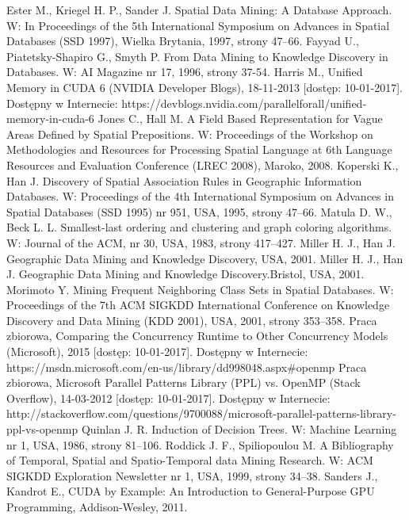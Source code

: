 \documentclass[12pt]{article}
\begin{document}
\begin{thebibliography}{}
Ester M., Kriegel H. P., Sander J. Spatial Data Mining: A Database Approach. W: In Proceedings of the 5th International Symposium on Advances in Spatial Databases (SSD 1997), Wielka Brytania, 1997, strony 47–66.
Fayyad U., Piatetsky-Shapiro G., Smyth P. From Data Mining to Knowledge Discovery in Databases. W: AI Magazine nr 17, 1996, strony 37-54.
Harris M., Unified Memory in CUDA 6 (NVIDIA Developer Blogs), 18-11-2013 [dostęp: 10-01-2017]. Dostępny w Internecie: https://devblogs.nvidia.com/parallelforall/unified-memory-in-cuda-6
Jones C., Hall M. A Field Based Representation for Vague Areas Defined by Spatial Prepositions. W: Proceedings of the Workshop on Methodologies and Resources for Processing Spatial Language at 6th Language Resources and Evaluation Conference (LREC 2008), Maroko, 2008.
Koperski K., Han J. Discovery of Spatial Association Rules in Geographic Information Databases. W: Proceedings of the 4th International Symposium on Advances in Spatial Databases (SSD 1995) nr 951, USA, 1995, strony 47–66.
Matula D. W., Beck L. L. Smallest-last ordering and clustering and graph coloring algorithms. W: Journal of the ACM, nr 30, USA, 1983, strony 417–427.
Miller H. J., Han J. Geographic Data Mining and Knowledge Discovery, USA, 2001.
Miller H. J., Han J. Geographic Data Mining and Knowledge Discovery.Bristol, USA, 2001.
Morimoto Y. Mining Frequent Neighboring Class Sets in Spatial Databases. W: Proceedings of the 7th ACM SIGKDD International Conference on Knowledge Discovery and Data Mining (KDD 2001), USA, 2001, strony 353–358.
Praca zbiorowa, Comparing the Concurrency Runtime to Other Concurrency Models (Microsoft), 2015 [dostęp: 10-01-2017]. Dostępny w Internecie: https://msdn.microsoft.com/en-us/library/dd998048.aspx\#openmp
Praca zbiorowa, Microsoft Parallel Patterns Library (PPL) vs. OpenMP (Stack Overflow), 14-03-2012 [dostęp: 10-01-2017]. Dostępny w Internecie: http://stackoverflow.com/questions/9700088/microsoft-parallel-patterns-library-ppl-vs-openmp
Quinlan J. R. Induction of Decision Trees. W: Machine Learning nr 1, USA, 1986, strony 81–106.
Roddick J. F., Spiliopoulou M. A Bibliography of Temporal, Spatial and Spatio-Temporal data Mining Research. W: ACM SIGKDD Exploration Newsletter nr 1, USA, 1999, strony 34–38.
Sanders J., Kandrot E., CUDA by Example: An Introduction to General-Purpose GPU Programming, Addison-Wesley, 2011.

\end{thebibliography}
\end{document}

